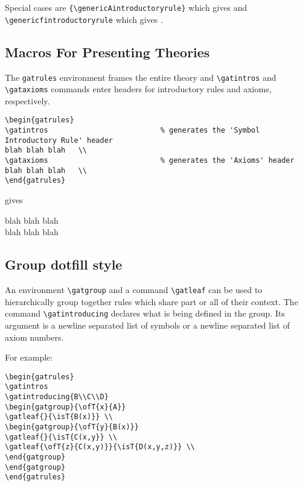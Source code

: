 \documentclass[10pt,a4paper]{article}
\begin{document}
Special cases are \verb!{\genericAintroductoryrule}!
 which gives \genericAintroductoryrule and 
\verb!\genericfintroductoryrule! which gives \genericfintroductoryrule.

\subsection{Macros For Presenting Theories}

The \verb'gatrules' environment frames the entire theory and \verb'\gatintros' and
\verb'\gataxioms' commands enter headers for introductory rules and axioms, respectively.

\begin{verbatim}
\begin{gatrules}
\gatintros                          % generates the 'Symbol Introductory Rule' header
blah blah blah   \\                   
\gataxioms                          % generates the 'Axioms' header
blah blah blah   \\
\end{gatrules}
\end{verbatim}
gives
\begin{gatrules}
\gatintros                          %
blah blah blah   \\                   
\gataxioms                          %
blah blah blah   \\
\end{gatrules}

\subsection{Group dotfill style}

An environment \verb'\gatgroup' and a command \verb'\gatleaf'  can be used to hierarchically group together rules which share part or all of their context. The command \verb'\gatintroducing' declares what is being defined in the group. Its argument is a newline separated list of symbols or a newline separated list of axiom numbers.

For example:
\begin{verbatim}
\begin{gatrules}
\gatintros
\gatintroducing{B\\C\\D}
\begin{gatgroup}{\ofT{x}{A}}
\gatleaf{}{\isT{B(x)}} \\
\begin{gatgroup}{\ofT{y}{B(x)}}
\gatleaf{}{\isT{C(x,y}} \\
\gatleaf{\ofT{z}{C(x,y)}}{\isT{D(x,y,z)}} \\
\end{gatgroup}
\end{gatgroup}
\end{gatrules}
\end{verbatim}
\end{document}

